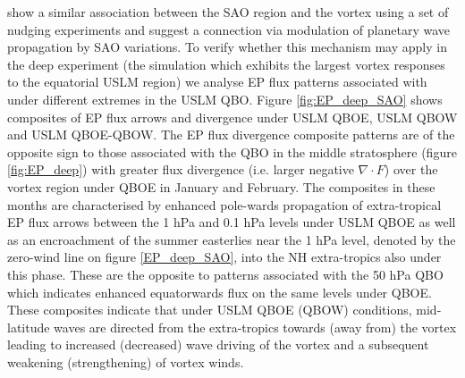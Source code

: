 \cite{grayForecasting2020a} show a similar association between the SAO region and the vortex using a set of nudging experiments and suggest a connection via modulation of planetary wave propagation by SAO variations. To verify whether this mechanism may apply in the deep experiment (the simulation which exhibits the largest vortex responses to the equatorial USLM region) we analyse EP flux patterns associated with under different extremes in the USLM QBO. Figure \ref{fig:EP_deep_SAO} shows composites of EP flux arrows and divergence under USLM QBOE, USLM QBOW and USLM QBOE-QBOW. The EP flux divergence composite patterns are of the opposite sign to those associated with the QBO in the middle stratosphere (figure \ref{fig:EP_deep}) with greater flux divergence (i.e. larger negative $\nabla \cdot F$) over the vortex region under QBOE in January and February. The composites in these months are characterised by enhanced pole-wards propagation of extra-tropical EP flux arrows between the 1 hPa and 0.1 hPa levels under USLM QBOE as well as an encroachment of the summer easterlies near the 1 hPa level, denoted by the zero-wind line on figure \ref{EP_deep_SAO}, into the NH extra-tropics also under this phase. These are the opposite to patterns associated with the 50 hPa QBO which indicates enhanced equatorwards flux on the same levels under QBOE. These composites indicate that under USLM QBOE (QBOW) conditions, mid-latitude waves are directed from the extra-tropics towards (away from) the vortex leading to increased (decreased) wave driving of the vortex and a subsequent weakening (strengthening) of vortex winds.


